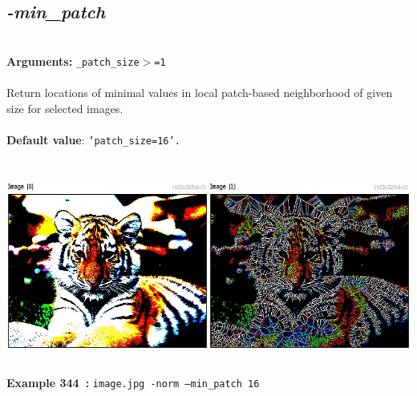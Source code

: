 \documentclass[a4paper,11pt,twoside]{book}
\begin{document}
\subsection{\emph{-min\_patch} }\vspace*{-0.5em}
~\\\textbf{Arguments: } 
{\small \texttt{\_patch\_size$>$=1}}\\~\\
Return locations of minimal values in local patch-based neighborhood of given size for selected images.
~\\~\\\textbf{Default value}: {\small \texttt{'patch\_size=16'.}}
\begin{center}\includegraphics[keepaspectratio=true,height=7cm,width=\textwidth]{img/gmic_def344.jpg}\\
{\footnotesize \textbf{Example 344~:} \texttt{image.jpg -norm --min\_patch 16}}
\end{center}
\end{document}
